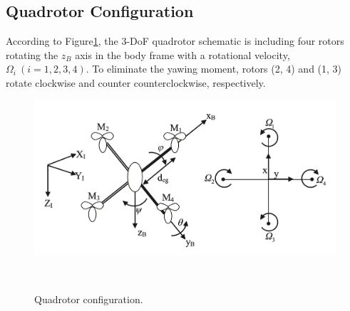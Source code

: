 \documentclass[3p]{elsarticle}
\begin{document}
 \subsection{Quadrotor Configuration}
 \noindent According to Figure\ref{fig:schematic}, the 3-DoF quadrotor schematic is including four rotors rotating the $z_B$ axis in the body frame with a rotational velocity, $\Omega_i~(i=1, 2, 3, 4)$. To eliminate the yawing moment, rotors (2, 4) and (1, 3) rotate clockwise and counter counterclockwise, respectively.

\begin{figure}[H]
    \centering
    \includegraphics[width=12cm]{../Figure/schematic.png}
    \caption{Quadrotor configuration.}
~\label{fig:schematic}
\end{figure}
\end{document}
